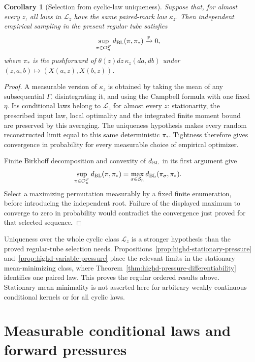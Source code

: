 \documentclass[11pt,reqno]{amsart}
\newtheorem{corollary}[theorem]{Corollary}
\theoremstyle{definition}
\theoremstyle{remark}
\numberwithin{equation}{section}
\newcommand{\Pp}{\mathbb P}
\begin{document}
\begin{corollary}[Selection from cyclic-law uniqueness]
\label{cor:highd-uniqueness-criterion}
Suppose that, for almost every \(z\), all laws in \(\mathcal L_z\)
have the same paired-mark law \(\kappa_z\). Then independent
empirical sampling in the present regular tube satisfies
\[
\sup_{\pi\in\mathcal O_n^F}d_{\rm BL}(\pi,\pi_*)
 \xrightarrow{\Pp}0,
\]
where \(\pi_*\) is the pushforward of
\(\theta(z)dz\,\kappa_z(da,db)\) under
\((z,a,b)\mapsto(X(a,z),X(b,z))\).
\end{corollary}

\begin{proof}
A measurable version of \(\kappa_z\) is obtained by taking the
mean of any subsequential \(\Gamma\), disintegrating it, and using
the Campbell formula with one fixed \(\eta\). Its conditional laws
belong to \(\mathcal L_z\) for almost every \(z\): stationarity,
the prescribed input law, local optimality and the integrated finite
moment bound are preserved by this averaging. The uniqueness
hypothesis makes every random reconstructed limit equal to this
same deterministic \(\pi_*\). Tightness therefore gives convergence
in probability for every measurable choice of empirical optimizer.

Finite Birkhoff decomposition and convexity of \(d_{\rm BL}\) in
its first argument give
\[
\sup_{\pi\in\mathcal O_n^F}d_{\rm BL}(\pi,\pi_*)
 =\max_{\sigma\in\mathcal S_n}d_{\rm BL}(\pi_\sigma,\pi_*).
\]
Select a maximizing permutation measurably by a fixed finite
enumeration, before introducing the independent root. Failure of the
displayed maximum to converge to zero in probability would contradict
the convergence just proved for that selected sequence.
\end{proof}

Uniqueness over the whole cyclic class \(\mathcal L_z\) is a
stronger hypothesis than the proved regular-tube selection needs.
Propositions~\ref{prop:highd-stationary-pressure}
and~\ref{prop:highd-variable-pressure} place the relevant limits
in the stationary mean-minimizing class, where
Theorem~\ref{thm:highd-pressure-differentiability} identifies one
paired law. This proves the regular ordered results above. Stationary
mean minimality is not asserted here for arbitrary weakly continuous
conditional kernels or for all cyclic laws.

\section{Measurable conditional laws and forward pressures}\label{sec:measurable-forward-pressure}
\end{document}
